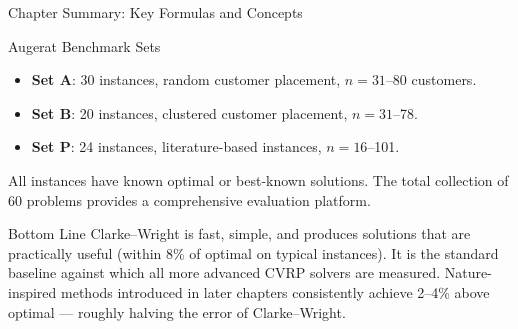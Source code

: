 \documentclass[aspectratio=169,10pt]{beamer}
\begin{document}
\begin{frame}[allowframebreaks]{Chapter Summary: Key Formulas and Concepts}
  \begin{block}{Augerat Benchmark Sets}
    \begin{itemize}
      \item \textbf{Set A}: 30 instances, random customer placement,
        $n = 31$--80 customers.
      \item \textbf{Set B}: 20 instances, clustered customer placement,
        $n = 31$--78.
      \item \textbf{Set P}: 24 instances, literature-based instances,
        $n = 16$--101.
    \end{itemize}
    All instances have known optimal or best-known solutions.  The total
    collection of 60 problems provides a comprehensive evaluation platform.
  \end{block}

  \begin{alertblock}{Bottom Line}
    Clarke--Wright is fast, simple, and produces solutions that are practically
    useful (within 8\% of optimal on typical instances).  It is the standard
    baseline against which all more advanced CVRP solvers are measured.
    Nature-inspired methods introduced in later chapters consistently achieve
    2--4\% above optimal --- roughly halving the error of Clarke--Wright.
  \end{alertblock}

\end{frame}
\end{document}

